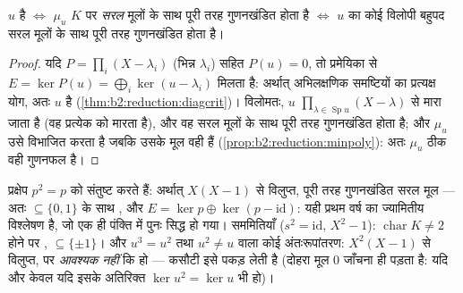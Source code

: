 \begin{corollary}[न्यूनतम बहुपद से विकर्णनीयता]\label{cor:b2:reduction:minpolycrit}
$u$  है $\iff$ $\mu_u$ $K$ पर \emph{सरल} मूलों के साथ पूरी तरह
गुणनखंडित होता है $\iff$ $u$ का कोई विलोपी बहुपद सरल मूलों के साथ पूरी
तरह गुणनखंडित होता है।
\end{corollary}

\begin{proof}
यदि $P = \prod_{i}(X - \lambda_i)$ (भिन्न $\lambda_i$) सहित $P(u) = 0$, तो प्रमेयिका से $E = \ker P(u) = \bigoplus_i \ker(u -
\lambda_i)$ मिलता है: अर्थात्
अभिलक्षणिक समष्टियों का प्रत्यक्ष योग, अतः $u$  है (\cref{thm:b2:reduction:diagcrit})।
विलोमतः,  $u$ $\prod_{\lambda \in \operatorname{Sp}u}(X -
\lambda)$ से मारा जाता है (वह प्रत्येक  को मारता है), और वह सरल मूलों के साथ पूरी तरह गुणनखंडित होता है;
और $\mu_u$ उसे विभाजित करता है जबकि उसके मूल वही हैं (\cref{prop:b2:reduction:minpoly}): अतः $\mu_u$ ठीक
वही गुणनफल है।
\end{proof}

\begin{example}\label{ex:b2:reduction:projections}
प्रक्षेप $p^2 = p$ को संतुष्ट करते हैं: अर्थात् $X(X-1)$ से विलुप्त, पूरी तरह
गुणनखंडित सरल मूल --- अतः  $\subseteq \{0, 1\}$ के साथ , और $E =
\ker p \oplus \ker(p - \mathrm{id})$: यही
प्रथम वर्ष का ज्यामितीय विश्लेषण है, जो एक ही पंक्ति में पुनः सिद्ध हो
गया। सममितियाँ ($s^2 = \mathrm{id}$,  $X^2 - 1$): $\operatorname{char} K
\neq 2$ होने पर ,  $\subseteq \{\pm 1\}$।
और $u^3 =
u^2$ तथा $u^2 \neq u$ वाला कोई अंतःरूपांतरण: $X^2(X - 1)$ से विलुप्त, पर
\emph{आवश्यक नहीं} कि  हो --- कसौटी इसे पकड़ लेती है (दोहरा
मूल $0$ जाँचना ही पड़ता है:  यदि और केवल यदि इसके अतिरिक्त
$\ker u^2 = \ker
u$ भी हो)।
\end{example}

